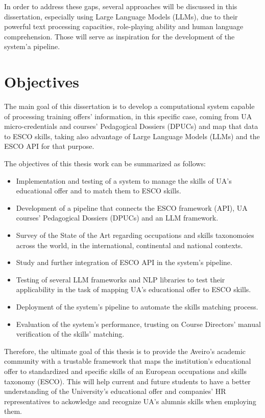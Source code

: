 In order to address these gaps, several approaches will be discussed in this dissertation, especially using Large Language Models (LLMs), due to their powerful text processing capacities, role-playing ability and human language comprehension. Those will serve as inspiration for the development of the system'a pipeline.


\section{Objectives}
The main goal of this dissertation is to develop a computational system capable of processing training offers’ information, in this specific case, coming from UA micro-credentials and courses’ Pedagogical Dossiers (DPUCs) and map that data to ESCO skills, taking also advantage of Large Language Models (LLMs) and the ESCO API for that purpose. 

The objectives of this thesis work can be summarized as follows:
\begin{itemize}
   \item{Implementation and testing of a system to manage the skills of UA's educational offer and to match them to ESCO skills.}
   \item{Development of a pipeline that connects the ESCO framework (API), UA courses' Pedagogical Dossiers (DPUCs) and an LLM framework.}
   \item{Survey of the State of the Art regarding occupations and skills taxonomoies across the world, in the international, continental and national contexts.}
   \item{Study and further integration of ESCO API in the system's pipeline.}
   \item{Testing of several LLM frameworks and NLP libraries to test their applicability in the task of mapping UA's educational offer to ESCO skills.}
   \item{Deployment of the system's pipeline to automate the skills matching process.}
   \item{Evaluation of the system's performance, trusting on Course Directors' manual verification of the skills' matching.}
\end{itemize}

Therefore, the ultimate goal of this thesis is to provide the Aveiro's academic community with a trustable framework that maps the institution's educational offer to standardized and specific skills of an European occupations and skills taxonomy (ESCO). This will help current and future students to have a better understanding of the University's educational offer and companies' HR representatives to ackowledge and recognize UA's alumnis skills when employing them.


